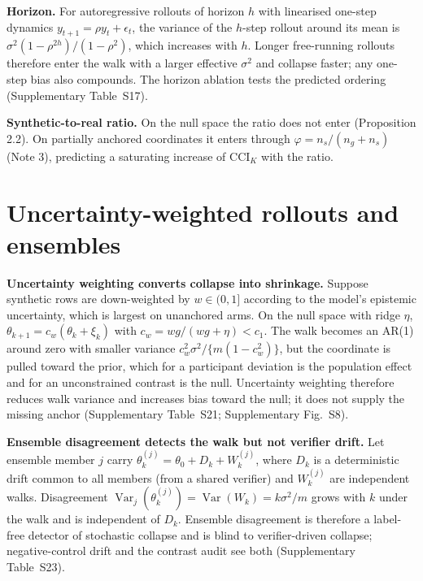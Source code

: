 \documentclass[11pt,a4paper]{article}
\newcommand{\Var}{\operatorname{Var}}
\newcommand{\CCI}{\mathrm{CCI}}
\begin{document}
\textbf{Horizon.} For autoregressive rollouts of horizon $h$ with linearised one-step dynamics $y_{t+1}=\rho y_t+\epsilon_t$, the variance of the $h$-step rollout around its mean is $\sigma^2(1-\rho^{2h})/(1-\rho^2)$, which increases with $h$. Longer free-running rollouts therefore enter the walk with a larger effective $\sigma^2$ and collapse faster; any one-step bias also compounds. The horizon ablation tests the predicted ordering (Supplementary Table~S17).

\textbf{Synthetic-to-real ratio.} On the null space the ratio does not enter (Proposition 2.2). On partially anchored coordinates it enters through $\varphi=n_s/(n_g+n_s)$ (Note 3), predicting a saturating increase of $\CCI_K$ with the ratio.

\section{Uncertainty-weighted rollouts and ensembles}
\textbf{Uncertainty weighting converts collapse into shrinkage.} Suppose synthetic rows are down-weighted by $w\in(0,1]$ according to the model's epistemic uncertainty, which is largest on unanchored arms. On the null space with ridge $\eta$, $\theta_{k+1}=c_w(\theta_k+\xi_k)$ with $c_w=wg/(wg+\eta)<c_1$. The walk becomes an AR(1) around zero with smaller variance $c_w^2\sigma^2/\{m(1-c_w^2)\}$, but the coordinate is pulled toward the prior, which for a participant deviation is the population effect and for an unconstrained contrast is the null. Uncertainty weighting therefore reduces walk variance and increases bias toward the null; it does not supply the missing anchor (Supplementary Table~S21; Supplementary Fig.~S8).

\textbf{Ensemble disagreement detects the walk but not verifier drift.} Let ensemble member $j$ carry $\theta^{(j)}_k=\theta_0+D_k+W^{(j)}_k$, where $D_k$ is a deterministic drift common to all members (from a shared verifier) and $W^{(j)}_k$ are independent walks. Disagreement $\Var_j(\theta^{(j)}_k)=\Var(W_k)=k\sigma^2/m$ grows with $k$ under the walk and is independent of $D_k$. Ensemble disagreement\cite{lakshminarayanan2017ensembles} is therefore a label-free detector of stochastic collapse and is blind to verifier-driven collapse; negative-control drift and the contrast audit see both (Supplementary Table~S23).
\end{document}
